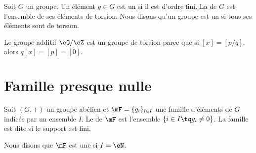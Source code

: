 Soit \( G\) un groupe. Un élément \( g\in G\) est un  si il est d'ordre fini. La  de \( G\) est l'ensemble de ses éléments de torsion. Nous disons qu'un groupe est un  si tous ses éléments sont de torsion.

\begin{example}
    Le groupe additif \( \eQ/\eZ\) est un groupe de torsion parce que si \( [x]=[p/q]\), alors \( q[x]=[p]=[0]\).
\end{example}

\section{Famille presque nulle}

Soit \( (G,+)\) un groupe abélien et \( \mF=\{ g_i \}_{i\in I}\) une famille d'éléments de \( G\) indicés par un ensemble \( I\). Le  de \( \mF\) est l'ensemble \( \{ i\in I\tq g_i\neq 0 \}\). La famille est dite  si le support est fini.

Nous disons que \( \mF\) est une  si \( I=\eN\).
